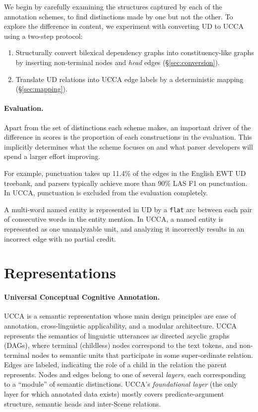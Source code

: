 \documentclass[11pt,a4paper]{article}
\begin{document}
We begin by carefully examining the structures captured by each of the annotation schemes,
to find distinctions made by one but not the other.
To explore the difference in content, we experiment with converting UD to UCCA
using a two-step protocol:
\begin{enumerate}
\item Structurally convert bilexical dependency graphs into constituency-like graphs by inserting
  non-terminal nodes and \textit{head} edges (\S\ref{sec:conversion}).
\item Translate UD relations into UCCA edge labels
  by a deterministic mapping (\S\ref{sec:mapping}).
\end{enumerate}

\paragraph{Evaluation.}

Apart from the set of distinctions each scheme makes,
an important driver of the difference in scores is the proportion of each constructions
in the evaluation.
This implicitly determines what the scheme focuses on and what parser developers
will spend a larger effort improving.

For example, punctuation takes up 11.4\% of the edges in the English EWT UD treebank,
and parsers typically achieve more than 90\% LAS F1 on punctuation.
In UCCA, punctuation is excluded from the evaluation completely.

A multi-word named entity is represented in UD by a \verb|flat| arc between
each pair of consecutive words in the entity mention.
In UCCA, a named entity is represented as one unanalyzable unit, and analyzing it
incorrectly results in an incorrect edge with no partial credit.



\section{Representations}\label{sec:representations}

\paragraph{Universal Conceptual Cognitive Annotation.}\label{sec:ucca}
UCCA \cite{abend2013universal} is a semantic representation whose main design principles
are ease of annotation, cross-linguistic applicability, and a modular architecture.
UCCA represents the semantics of linguistic utterances
as directed acyclic graphs (DAGs), where terminal (childless) nodes
correspond to the text tokens, and non-terminal nodes to semantic units that participate
in some super-ordinate relation.
Edges are labeled, indicating the role of a child in the relation the parent represents.
Nodes and edges belong to one of several \textit{layers}, each corresponding
to a ``module'' of semantic distinctions.
UCCA's \textit{foundational layer} (the only layer for which annotated data exists)
mostly covers predicate-argument structure, semantic heads and inter-Scene relations.
\end{document}
